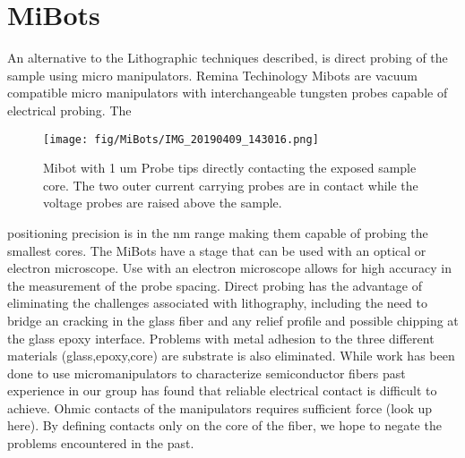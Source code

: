 




\chapter{MiBots}
An alternative to the Lithographic techniques described, is direct probing of the sample using micro manipulators. Remina Techinology Mibots are vacuum compatible micro manipulators with interchangeable tungsten probes capable of electrical probing. The 
\begin{wrapfigure}{r}{.7\textwidth}
\texttt{[image: fig/MiBots/IMG\_20190409\_143016.png]}
\caption{Mibot with 1 um Probe tips directly contacting the exposed sample core. The two outer current carrying probes are in contact while the voltage probes are raised above the sample.}
\end{wrapfigure} 
positioning precision is in the nm range making them capable of probing the smallest cores. The MiBots have a stage that can be used with an optical or electron microscope. Use with an electron microscope allows for high accuracy in the measurement of the probe spacing. Direct probing has the advantage of eliminating the challenges associated with lithography, including the need to bridge an cracking in the glass fiber and any relief profile and possible chipping at the glass epoxy interface. Problems with metal adhesion to the three different materials (glass,epoxy,core) are substrate is also eliminated. While work has been done to use micromanipulators to characterize semiconductor fibers \cite{Engel2016DirectPhotosynthesis} 
past experience in our group has found that reliable electrical contact is difficult to achieve. Ohmic contacts of the manipulators requires sufficient force (look up here). By defining contacts only on the core of the fiber, we hope to negate the problems encountered in the past. 


\cleardoublepage
